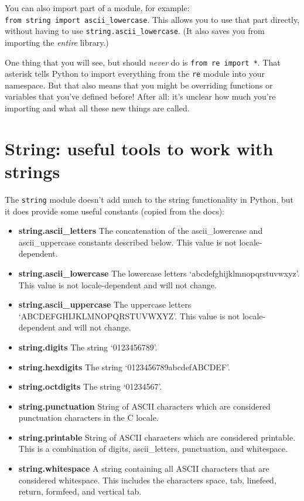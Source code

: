 \documentclass[12pt]{book}
\begin{document}
You can also import part of a module, for example: \texttt{from\ string\ import\ ascii\_lowercase}. This allows you to use that part directly, without having to use \texttt{string.ascii\_lowercase}. (It also saves you from importing the
\emph{entire} library.)

One thing that you will see, but should \emph{never} do is \texttt{from\ re\ import\ *}. That asterisk tells Python to import everything from the \texttt{re} module into your namespace. But that also means that you might be overriding functions or variables that you've defined before! After all: it's unclear how much you're importing and what all these new things are called.

\section{String: useful tools to work with strings}

The \texttt{string} module doesn't add much to the string functionality
in Python, but it does provide some useful constants (copied from the
docs):

\begin{itemize}
\item \textbf{string.ascii\_letters} The concatenation of the
  ascii\_lowercase and ascii\_uppercase constants described below. This
  value is not locale-dependent.
\item \textbf{string.ascii\_lowercase} The lowercase letters
  `abcdefghijklmnopqrstuvwxyz'. This value is not locale-dependent and
  will not change.
\item \textbf{string.ascii\_uppercase} The uppercase letters
  `ABCDEFGHIJKLMNOPQRSTUVWXYZ'. This value is not locale-dependent and
  will not change.
\item \textbf{string.digits} The string `0123456789'.
\item \textbf{string.hexdigits} The string `0123456789abcdefABCDEF'.
\item \textbf{string.octdigits} The string `01234567'.
\item \textbf{string.punctuation} String of ASCII characters which are
  considered punctuation characters in the C locale.
\item \textbf{string.printable} String of ASCII characters which are
  considered printable. This is a combination of digits, ascii\_letters,
  punctuation, and whitespace.
\item \textbf{string.whitespace} A string containing all ASCII characters
  that are considered whitespace. This includes the characters space,
  tab, linefeed, return, formfeed, and vertical tab.
\end{itemize}
\end{document}

